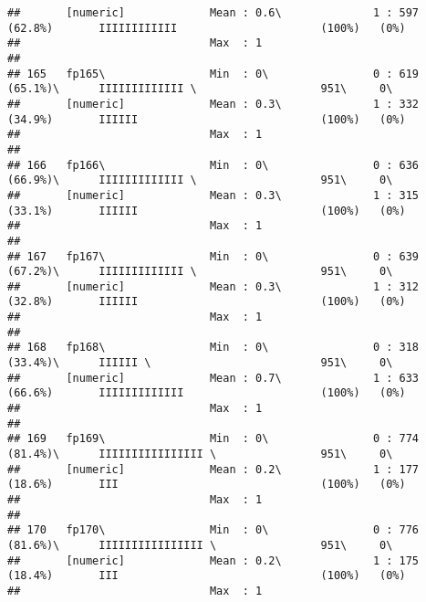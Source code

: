 \documentclass[]{article}
\begin{document}
\begin{verbatim}
##       [numeric]             Mean : 0.6\              1 : 597 (62.8%)       IIIIIIIIIIII                      (100%)   (0%)     
##                             Max  : 1                                                                                           
## 
## 165   fp165\                Min  : 0\                0 : 619 (65.1%)\      IIIIIIIIIIIII \                   951\     0\       
##       [numeric]             Mean : 0.3\              1 : 332 (34.9%)       IIIIII                            (100%)   (0%)     
##                             Max  : 1                                                                                           
## 
## 166   fp166\                Min  : 0\                0 : 636 (66.9%)\      IIIIIIIIIIIII \                   951\     0\       
##       [numeric]             Mean : 0.3\              1 : 315 (33.1%)       IIIIII                            (100%)   (0%)     
##                             Max  : 1                                                                                           
## 
## 167   fp167\                Min  : 0\                0 : 639 (67.2%)\      IIIIIIIIIIIII \                   951\     0\       
##       [numeric]             Mean : 0.3\              1 : 312 (32.8%)       IIIIII                            (100%)   (0%)     
##                             Max  : 1                                                                                           
## 
## 168   fp168\                Min  : 0\                0 : 318 (33.4%)\      IIIIII \                          951\     0\       
##       [numeric]             Mean : 0.7\              1 : 633 (66.6%)       IIIIIIIIIIIII                     (100%)   (0%)     
##                             Max  : 1                                                                                           
## 
## 169   fp169\                Min  : 0\                0 : 774 (81.4%)\      IIIIIIIIIIIIIIII \                951\     0\       
##       [numeric]             Mean : 0.2\              1 : 177 (18.6%)       III                               (100%)   (0%)     
##                             Max  : 1                                                                                           
## 
## 170   fp170\                Min  : 0\                0 : 776 (81.6%)\      IIIIIIIIIIIIIIII \                951\     0\       
##       [numeric]             Mean : 0.2\              1 : 175 (18.4%)       III                               (100%)   (0%)     
##                             Max  : 1                                                                                           

\end{verbatim}
\end{document}
